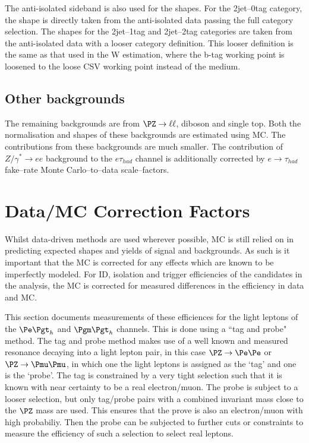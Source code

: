 The anti-isolated sideband is also used for the shapes. For the 2jet--0tag
category, the shape is directly taken from the anti-isolated data passing the
full category selection. The shapes for the 2jet--1tag
and 2jet--2tag categories are taken from the anti-isolated data with a 
looser category definition. This looser definition is the same as that used in
the W estimation, where the b-tag working point is loosened to the loose CSV
working point instead of the medium.

\subsection{Other backgrounds}
The remaining backgrounds are from $\PZ \to \ell\ell$, diboson and single top.
Both the normalisation and shapes of these backgrounds are estimated using MC.
The contributions from these backgrounds are much smaller.
The contribution of $Z/\gamma^{*} \to ee$ background to the $e\tau_{had}$ channel
is additionally corrected by $e \to \tau_{had}$ fake--rate Monte Carlo--to--data
scale--factors.

\section{Data/MC Correction Factors}
\label{sec:datamcfactors}

Whilst data-driven methods are used wherever possible, MC is still
relied on in predicting expected shapes and yields of signal and backgrounds.
As such is it important that the MC is corrected for
any effects which are known to be imperfectly modeled. For ID, isolation and
trigger efficiencies of the candidates in the analysis, the \ac{MC} is corrected
for measured differences in the efficiency in data and \ac{MC}.

This section documents measurements of these efficiences for the light leptons
of the $\etau$ and $\mutau$ channels. This is done using a ``tag and probe" method.
The tag and probe method makes use of a well known and measured resonance decaying
into a light lepton pair, in this case $\PZ\to\Pe\Pe$ or $\PZ\to\Pmu\Pmu$, 
in which one the light leptons is assigned as the `tag' and one is the `probe'. 
The tag is constrained by a very tight selection such that it is known with near 
certainty to be a real electron/muon. The probe is subject to a looser selection, 
but only tag/probe pairs with a
combined invariant mass close to the $\PZ$ mass are used. This ensures that the
prove is also an electron/muon with high probabiliy. Then the probe can be 
subjected to further cuts or constraints to measure the efficiency of such a 
selection to select real leptons.

